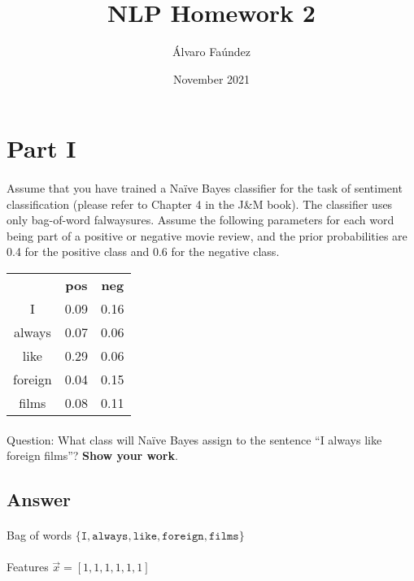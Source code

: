 \documentclass{article}
\title{NLP Homework 2}
\author{Álvaro Faúndez}
\date{November 2021}
\begin{document}
\maketitle

\section*{Part I}

\paragraph{} Assume that you have trained a Naïve Bayes classifier for the task of sentiment classification (please refer to Chapter 4 in the J\&M book). The classifier uses only bag-of-word falwaysures. Assume the following parameters for each word being part of a positive or negative movie review, and the prior probabilities are 0.4 for the positive class and 0.6 for the negative class.

\begin{tabular}{c|c|c}
    \hline
     & \textbf{pos} & \textbf{neg} \\
    I & 0.09 & 0.16 \\
    always & 0.07 & 0.06 \\
    like & 0.29 & 0.06 \\
    foreign & 0.04 & 0.15 \\
    films & 0.08 & 0.11 \\
\end{tabular}

\paragraph{} Question: What class will Naïve Bayes assign to the sentence “I always like foreign films”? \textbf{Show your work}.

\subsection*{Answer}

\paragraph{} Bag of words $\{\texttt{I}, \texttt{always}, \texttt{like}, \texttt{foreign}, \texttt{films}\}$

\paragraph{} Features $\vec{x} = [1, 1, 1, 1, 1, 1]$
\end{document}
